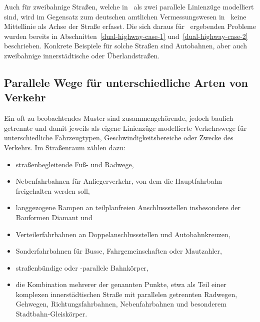 \documentclass[../main/thesis.tex]{subfiles}
\begin{document}
Auch für zweibahnige Straßen, welche in \osm\ als zwei parallele Linienzüge modelliert sind, wird im Gegensatz zum deutschen amtlichen Vermessungswesen  in \osm\ keine Mittellinie als Achse der Straße erfasst.
Die sich daraus für \osm\ ergebenden Probleme wurden bereits in Abschnitten~\ref{dual-highway-case-1} und~\ref{dual-highway-case-2} beschrieben.
Konkrete Beispiele für solche Straßen sind Autobahnen, aber auch zweibahnige innerstädtische oder Überlandstraßen.



\subsection{Parallele Wege für unterschiedliche Arten von Verkehr}
\label{ch:different-traffic-types-case-desc}

Ein oft zu beobachtendes Muster sind zusammengehörende, jedoch baulich getrennte und damit jeweils als eigene Linienzüge modellierte Verkehrswege für unterschiedliche Fahrzeugtypen, Geschwindigkeitsbereiche oder Zwecke des Verkehrs.
Im Straßenraum zählen dazu:

\begin{itemize}
	\item straßenbegleitende Fuß- und Radwege,
	\item Nebenfahrbahnen  für Anliegerverkehr, von dem die Hauptfahrbahn freigehalten werden soll,
	\item langgezogene Rampen an teilplanfreien Anschlussstellen insbesondere der Bauformen Diamant und 
	\item Verteilerfahrbahnen an Doppelanschlussstellen und Autobahnkreuzen,
	\item Sonderfahrbahnen für Busse, Fahrgemeinschaften oder Mautzahler,
	\item straßenbündige oder -parallele Bahnkörper,
	\item die Kombination mehrerer der genannten Punkte, etwa als Teil einer komplexen innerstädtischen Straße mit parallelen getrennten Radwegen, Gehwegen, Richtungsfahrbahnen, Nebenfahrbahnen und besonderem Stadtbahn-Gleiskörper.
\end{itemize}
\end{document}
